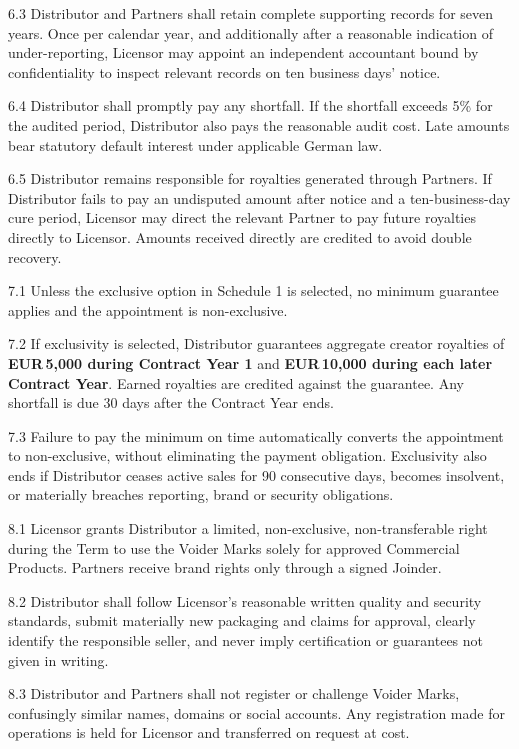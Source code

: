 \documentclass[11pt,a4paper]{article}
\newcommand{\money}{EUR\,}
\newcommand{\strong}[1]{\textbf{\color{voiderblue}#1}}
\newcommand{\articleheading}[2]{%
  \par\medskip{\large\bfseries\color{voiderblue}#1\quad #2}\par\smallskip
}
\begin{document}
6.3 Distributor and Partners shall retain complete supporting records for seven years. Once per calendar year, and additionally after a reasonable indication of under-reporting, Licensor may appoint an independent accountant bound by confidentiality to inspect relevant records on ten business days' notice.

6.4 Distributor shall promptly pay any shortfall. If the shortfall exceeds 5\% for the audited period, Distributor also pays the reasonable audit cost. Late amounts bear statutory default interest under applicable German law.

6.5 Distributor remains responsible for royalties generated through Partners. If Distributor fails to pay an undisputed amount after notice and a ten-business-day cure period, Licensor may direct the relevant Partner to pay future royalties directly to Licensor. Amounts received directly are credited to avoid double recovery.

\articleheading{7.}{Minimum royalties and exclusivity}

7.1 Unless the exclusive option in Schedule 1 is selected, no minimum guarantee applies and the appointment is non-exclusive.

7.2 If exclusivity is selected, Distributor guarantees aggregate creator royalties of \strong{\money5,000 during Contract Year 1} and \strong{\money10,000 during each later Contract Year}. Earned royalties are credited against the guarantee. Any shortfall is due 30 days after the Contract Year ends.

7.3 Failure to pay the minimum on time automatically converts the appointment to non-exclusive, without eliminating the payment obligation. Exclusivity also ends if Distributor ceases active sales for 90 consecutive days, becomes insolvent, or materially breaches reporting, brand or security obligations.

\articleheading{8.}{Voider brand}

8.1 Licensor grants Distributor a limited, non-exclusive, non-transferable right during the Term to use the Voider Marks solely for approved Commercial Products. Partners receive brand rights only through a signed Joinder.

8.2 Distributor shall follow Licensor's reasonable written quality and security standards, submit materially new packaging and claims for approval, clearly identify the responsible seller, and never imply certification or guarantees not given in writing.

8.3 Distributor and Partners shall not register or challenge Voider Marks, confusingly similar names, domains or social accounts. Any registration made for operations is held for Licensor and transferred on request at cost.
\end{document}
